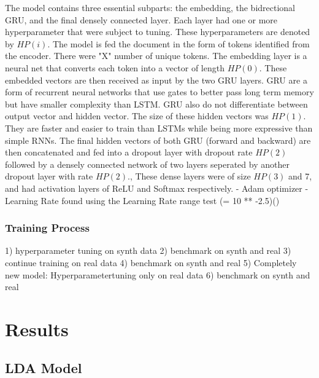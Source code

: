 \documentclass[11pt]{article}
\begin{document}
The model contains three essential subparts: the embedding, the bidrectional GRU, and the final densely connected layer. Each layer had one or more hyperparameter that were subject to tuning. These hyperparameters are denoted by $HP(i)$. The model is fed the document in the form of tokens identified from the encoder. There were "X" number of unique tokens. The embedding layer is a neural net that converts each token into a vector of length $HP(0)$. These embedded vectors are then received as input by the two GRU layers. GRU are a form of recurrent neural networks that use gates to better pass long term memory but have smaller complexity than LSTM. GRU also do not differentiate between output vector and hidden vector. The size of these hidden vectors was $HP(1)$. They are faster and easier to train than LSTMs while being more expressive than simple RNNs. The final hidden vectors of both GRU (forward and backward) are then concatenated and fed into a dropout layer with dropout rate $HP(2)$ followed by a densely connected network of two layers seperated by another dropout layer with rate $HP(2)$., These dense layers were of size $HP(3)$ and 7, and had activation layers of ReLU and Softmax respectively.
- Adam optimizer
- Learning Rate found using the Learning Rate range test (= 10 ** -2.5)(\cite{smith2018disciplined})

\subsubsection{Training Process}
1) hyperparameter tuning on synth data
2) benchmark on synth and real
3) continue training on real data
4) benchmark on synth and real
5) Completely new model: Hyperparametertuning only on real data
6) benchmark on synth and real


\section{Results}
\subsection{LDA Model}
\end{document}
